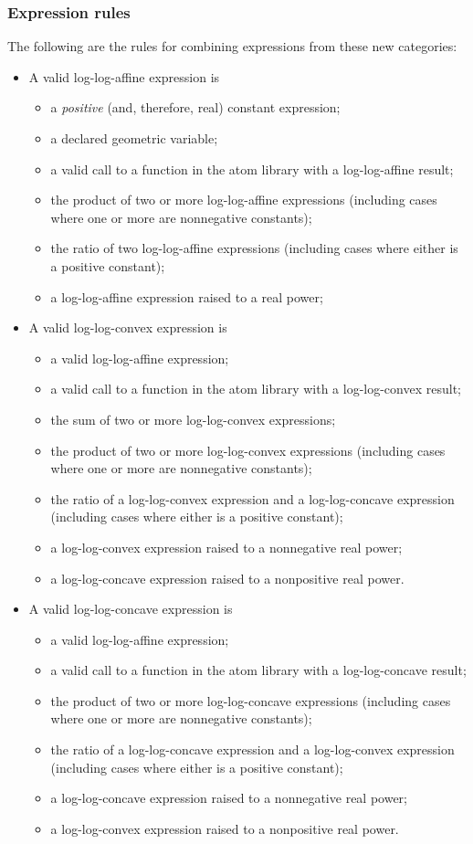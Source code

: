 \documentclass[12pt]{article}
\begin{document}
\subsubsection{Expression rules}
\label{sec:gp-expressions}

The following are the rules for combining expressions from these new categories:
\begin{itemize}
\item A valid log-log-affine expression is
\begin{itemize}
\item a \emph{positive} (and, therefore, real) constant expression;
\item a declared geometric variable;
\item a valid call to a function in the atom library with a log-log-affine result;
\item the product of two or more log-log-affine expressions  (including cases where one or more are nonnegative constants);
\item the ratio of two log-log-affine expressions (including cases where either is a positive constant);
\item a log-log-affine expression raised to a real power;
\end{itemize}
\item A valid log-log-convex expression is
\begin{itemize}
\item a valid log-log-affine expression;
\item a valid call to a function in the atom library with a log-log-convex result;
\item the sum of two or more log-log-convex expressions;
\item the product of two or more log-log-convex expressions  (including cases where one or more are nonnegative constants);
\item the ratio of a log-log-convex expression and a log-log-concave expression (including cases where either is a positive constant);
\item a log-log-convex expression raised to a nonnegative real power;
\item a log-log-concave expression raised to a nonpositive real power.
\end{itemize}
\item A valid log-log-concave expression is
\begin{itemize}
\item a valid log-log-affine expression;
\item a valid call to a function in the atom library with a log-log-concave result;
\item the product of two or more log-log-concave expressions  (including cases where one or more are nonnegative constants);
\item the ratio of a log-log-concave expression and a log-log-convex expression (including cases where either is a positive constant);
\item a log-log-concave expression raised to a nonnegative real power;
\item a log-log-convex expression raised to a nonpositive real power.
\end{itemize}
\end{itemize}
\end{document}
